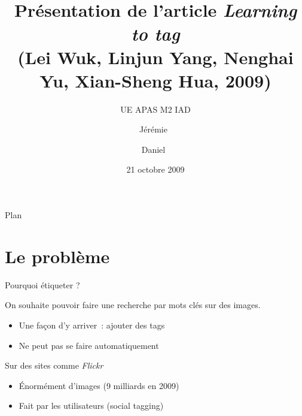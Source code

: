 \documentclass{beamer}
\title[Learning to tag]{Présentation de l'article \emph{Learning to tag} \\
    (Lei Wuk, Linjun Yang, Nenghai Yu, Xian-Sheng Hua, 2009)}
\subtitle {UE APAS M2 IAD}
\author[Decock, Ristic] %
{Jérémie~\bsc{Decock} \and Daniel~\bsc{Ristic}}
\institute[Universités Pierre et Marie Curie]
{
  Master d'Informatique\\
  Université Pierre et Marie Curie
}
\date[]
{21 octobre 2009}
\begin{document}
\begin{frame}
  \titlepage
\end{frame}

\begin{frame}{Plan}
  \tableofcontents
\end{frame}






\section{Le problème}

\begin{frame}{Pourquoi étiqueter ?}

	On souhaite pouvoir faire une recherche par mots clés sur des images.
	\begin{itemize}
        \item Une façon d'y arriver~: ajouter des tags
        \item Ne peut pas se faire automatiquement
	\end{itemize}

	Sur des sites comme \emph{Flickr}
	\begin{itemize}
        \item Énormément d'images (9 milliards en 2009)
        \item Fait par les utilisateurs (social tagging)
	\end{itemize}

\end{frame}
\end{document}
